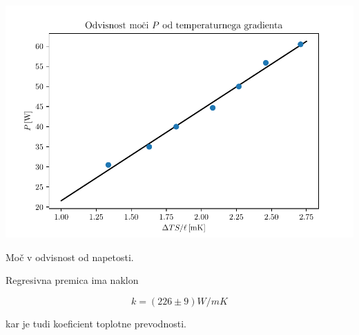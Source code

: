 \documentclass[12pt]{report}
\begin{document}
\begin{slika}[H]
  \centering
  \includegraphics{lambda-fit}
  \caption{\small Moč v odvisnost od napetosti.}
\end{slika}

Regresivna premica ima naklon 

\[k = (226 \pm 9)W/mK\]

kar je tudi koeficient toplotne prevodnosti. 
\end{document}
